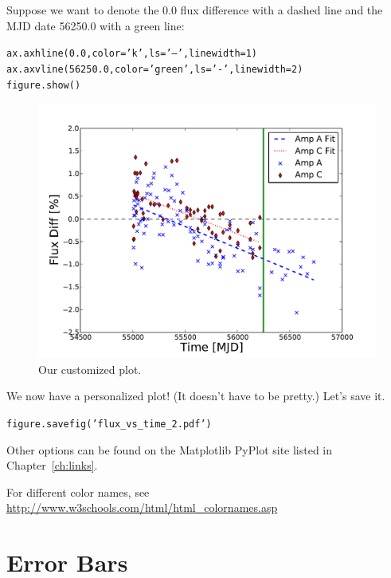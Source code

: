 Suppose we want to denote the 0.0 flux difference with a dashed line and the
MJD date 56250.0 with a green line:

\begin{alltt}
\pytab ax.axhline(0.0, color='k', ls='--', linewidth=1)  
\pytab ax.axvline(56250.0, color='green', ls='-', linewidth=2) 
\pytab figure.show()
\end{alltt}

\begin{figure}[tbp]
  \centering
    \includegraphics[scale=0.55]{flux_vs_time_2.pdf}
    \caption{Our customized plot.}
  \label{fig:splot}
\end{figure}

We now have a personalized plot! (It doesn't have to be pretty.) Let's save it.

\begin{alltt}
\pytab figure.savefig('flux_vs_time_2.pdf')
\end{alltt}

Other options can be found on the Matplotlib PyPlot site listed in Chapter~\ref{ch:links}. 

For different color names, see \href{http://www.w3schools.com/html/html_colornames.asp}
{http://www.w3schools.com/html/html\_colornames.asp}



\section{Error Bars}


